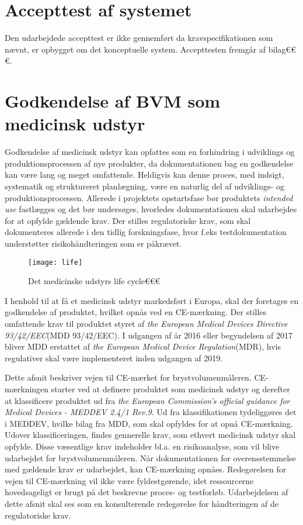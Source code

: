 \section{Accepttest af systemet}
Den udarbejdede accepttest er ikke gennemført da kravspecifikationen som nævnt, er opbygget om det konceptuelle system. Accepttesten fremgår af bilag€€€. 

\section{Godkendelse af BVM som medicinsk udstyr}
Godkendelse af medicinsk udstyr kan opfattes som en forhindring i udviklings og produktionsprocessen af nye produkter, da dokumentationen bag en godkendelse kan være lang og meget omfattende. Heldigvis kan denne proces, med indsigt, systematik og struktureret planlægning, være en naturlig del af udviklings- og produktionsprocessen. Allerede i projektets opstartsfase bør produktets \textit{intended use} fastlægges og det bør undersøges, hvorledes dokumentationen skal udarbejdes for at opfylde gældende krav.
Der stilles regulatoriske krav, som skal dokumenteres allerede i den tidlig forskningsfase, hvor f.eks testdokumentation understøtter risikohåndteringen som er påkrævet. 

\begin{figure}[htb]
\centering	
\texttt{[image: life]}
\caption{Det medicinske udstyrs life cycle€€€}
\label{fig:label}
\end{figure}

I henhold til at få et medicinsk udstyr markedsført i Europa, skal der foretages en godkendelse af produktet, hvilket opnås ved en CE-mærkning. Der stilles omfattende krav til produktet styret af \textit{the European Medical Devices Directive 93/42/EEC}{}(MDD 93/42/EEC). I udgangen af år 2016 eller begyndelsen af 2017 bliver MDD erstattet af \textit{the European Medical Device Regulation}{}(MDR), hvis regulativer skal være implementeret inden udgangen af 2019. 
  
Dette afsnit beskriver vejen til CE-mærket for brystvolumenmåleren. CE-mærkningen starter ved at definere produktet som medicinsk udstyr og derefter at klassificere produktet ud fra \textit{the European Commission's official guidance for Medical Devices - MEDDEV 2.4/1 Rev.9}. Ud fra klassifikationen tydeliggøres det i MEDDEV, hvilke bilag fra MDD, som skal opfyldes for at opnå CE-mærkning. 
Udover klassificeringen, findes gennerelle krav, som ethvert medicinsk udstyr skal opfylde. Disse væsentlige krav indeholder bl.a. en risikoanalyse, som vil blive udarbejdet for brystvolumenmåleren. 
Når dokumentationen for overensstemmelse med gældende krav er udarbejdet, kan CE-mærkning opnåes.
Redegørelsen for vejen til CE-mærkning vil ikke være fyldestgørende, idet ressourcerne hovedsageligt er brugt på det beskrevne proces- og testforløb. Udarbejdelsen af dette afsnit skal ses som en konsulterende redegørelse for håndteringen af de regulatoriske krav. 

